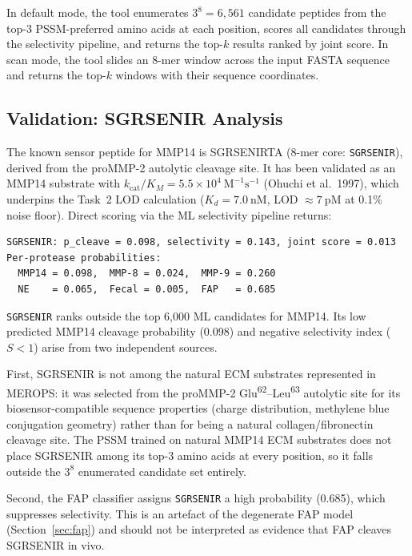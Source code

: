 \documentclass[10pt,a4paper]{article}
\begin{document}
In default mode, the tool enumerates $3^8 = 6{,}561$ candidate peptides from the top-3
PSSM-preferred amino acids at each position, scores all candidates through the selectivity
pipeline, and returns the top-$k$ results ranked by joint score. In scan mode, the tool
slides an 8-mer window across the input FASTA sequence and returns the top-$k$ windows
with their sequence coordinates.

\subsection{Validation: SGRSENIR Analysis}

The known sensor peptide for MMP14 is SGRSENIRTA (8-mer core: \texttt{SGRSENIR}),
derived from the proMMP-2 autolytic cleavage site. It has been validated as an MMP14
substrate with $k_\text{cat}/K_M = 5.5 \times 10^4\ \text{M}^{-1}\text{s}^{-1}$
(Ohuchi et al.\ 1997), which underpins the Task~2 LOD calculation ($K_d = 7.0\ \text{nM}$,
LOD $\approx 7\ \text{pM}$ at 0.1\% noise floor). Direct scoring via the ML selectivity
pipeline returns:

\begin{lstlisting}
SGRSENIR: p_cleave = 0.098, selectivity = 0.143, joint score = 0.013
Per-protease probabilities:
  MMP14 = 0.098,  MMP-8 = 0.024,  MMP-9 = 0.260
  NE    = 0.065,  Fecal = 0.005,  FAP   = 0.685
\end{lstlisting}

\texttt{SGRSENIR} ranks outside the top 6{,}000 ML candidates for MMP14. Its low
predicted MMP14 cleavage probability (0.098) and negative selectivity index ($S < 1$)
arise from two independent sources.

First, SGRSENIR is not among the natural ECM substrates represented in MEROPS: it
was selected from the proMMP-2 Glu\textsuperscript{62}--Leu\textsuperscript{63} autolytic
site for its biosensor-compatible sequence properties (charge distribution, methylene
blue conjugation geometry) rather than for being a natural collagen/fibronectin cleavage
site. The PSSM trained on natural MMP14 ECM substrates does not place SGRSENIR among
its top-3 amino acids at every position, so it falls outside the $3^8$ enumerated
candidate set entirely.

Second, the FAP classifier assigns \texttt{SGRSENIR} a high probability (0.685), which
suppresses selectivity. This is an artefact of the degenerate FAP model (Section~\ref{sec:fap})
and should not be interpreted as evidence that FAP cleaves SGRSENIR in vivo.
\end{document}
